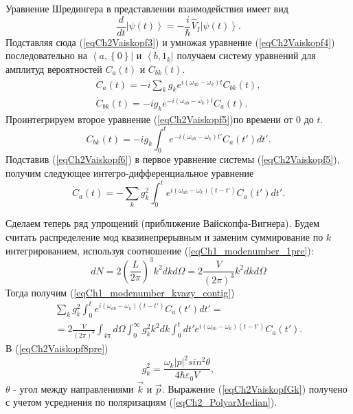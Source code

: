 Уравнение Шредингера в представлении взаимодействия имеет вид
\begin{equation}
\frac{d}{dt} \left|\psi\left(t\right)\right> =
- \frac{i}{\hbar} \hat{V}_I \left|\psi\left(t\right)\right>.
\label{eqCh2Vaiskopf4}
\end{equation}
Подставляя сюда (\ref{eqCh2Vaiskopf3}) и умножая уравнение
(\ref{eqCh2Vaiskopf4}) последовательно на
$\left<a, \left\{0\right\}\right|$ и $\left<b, 1_k\right|$ получаем
систему уравнений для амплитуд вероятностей 
$C_{a}\left(t\right)$ и $C_{bk}\left(t\right)$.
\begin{eqnarray}
\dot{C}_{a}\left(t\right) = - i \sum_{k} g_k e^{i \left(\omega_{ab} - 
  \omega_k\right)t} C_{bk}\left(t\right),
\nonumber \\
\dot{C}_{bk}\left(t\right) = - i g_k e^{- i \left(\omega_{ab} -
  \omega_k\right)t} C_{a}\left(t\right).
\label{eqCh2Vaiskopf5}
\end{eqnarray}
Проинтегрируем второе уравнение (\ref{eqCh2Vaiskopf5})по времени от $0$ до
$t$. 
\begin{equation}
C_{bk}\left(t\right) = - i g_k \int_0^{t} e^{- i \left(\omega_{ab} -
  \omega_k\right)t'} C_{a}\left(t'\right) dt'.
\label{eqCh2Vaiskopf6}
\end{equation}
Подставив (\ref{eqCh2Vaiskopf6}) в первое уравнение системы
(\ref{eqCh2Vaiskopf5}), получим следующее интегро-дифференциальное
уравнение
\begin{equation}
\dot{C}_{a}\left(t\right) = - \sum_{k} g_k^2 
\int_0^t
e^{i \left(\omega_{ab} - \omega_k\right)\left(t - t'\right)}  
C_{a}\left(t'\right) dt'.
\label{eqCh2Vaiskopf7}
\end{equation}

Сделаем теперь ряд упрощений (приближение Вайскопфа-Вигнера). Будем
считать распределение мод квазинепрерывным и заменим суммирование по
$k$ интегрированием, используя соотношение
(\ref{eqCh1_modenumber_1pre}):
\begin{equation}
d N = 2 \left(\frac{L}{2 \pi} \right)^3 k^2 d k d \Omega = 
2 \frac{V}{\left(2 \pi\right)^3}  k^2 d k d \Omega
\nonumber
\end{equation}
Тогда получим (\ref{eqCh1_modenumber_kvazy_contig})
\begin{eqnarray}
\sum_{k} g_k^2 
\int_0^t
e^{i \left(\omega_{ab} - \omega_k\right)\left(t - t'\right)}  
C_{a}\left(t'\right) dt' = 
\nonumber \\
= 2 \frac{V}{\left(2 \pi\right)^3} \int_{4\pi}d \Omega \int_0^{\infty}
g_k^2 k^2 dk  \int_0^t dt'
e^{i \left(\omega_{ab} - \omega_k\right)\left(t - t'\right)}  
C_{a}\left(t'\right).
\label{eqCh2Vaiskopf8pre}
\end{eqnarray}
В (\ref{eqCh2Vaiskopf8pre}) 
\begin{equation}
g_k^2 = \frac{\omega_k\left|p\right|^2 sin^2 \theta}{4 \hbar
  \varepsilon_0 V},
\label{eqCh2VaiskopfGk}
\end{equation}
$\theta$ - угол между направлениями $\vec{k}$ и $\vec{p}$.
Выражение (\ref{eqCh2VaiskopfGk}) получено с учетом усреднения по
поляризациям (\ref{eqCh2_PolyarMedian}).

